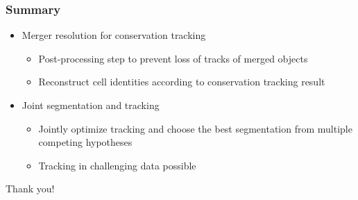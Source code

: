 \begin{frame}
    \frametitle{Summary}
    \begin{itemize}
          \item<1-> Merger resolution for conservation tracking
        \begin{itemize}
              \item Post-processing step to prevent loss of tracks of merged objects
              \item Reconstruct cell identities according to conservation tracking result
        \end{itemize}
          \item<2-> Joint segmentation and tracking
        \begin{itemize}
              \item Jointly optimize tracking and choose the best segmentation from multiple
            competing hypotheses
              \item Tracking in challenging data possible
        \end{itemize}
    \end{itemize}
\end{frame}


\begin{frame}
    \begin{center}
        Thank you!
    \end{center}
\end{frame}



